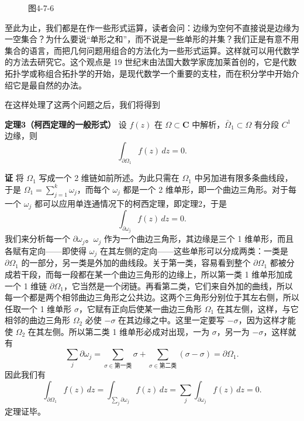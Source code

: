 \begin{figure}[htbp]
\centering
{}
\caption*{图4-7-6}
\end{figure}

至此为止，我们都是在作一些形式运算，读者会问：边缘为空何不直接说是边缘为一空集合？为什么要说“单形之和”，而不说是一些单形的并集？我们正是有意不用集合的语言，而把几何问题用组合的方法化为一些形式运算。这样就可以用代数学的方法去研究它。这个观点是 19 世纪末由法国大数学家庞加莱首创的，它是代数拓扑学或称组合拓扑学的开始，是现代数学一个重要的支柱，而在积分学中开始介绍它是最自然的办法。

在这样处理了这两个问题之后，我们将得到

\noindent\textbf{定理3（柯西定理的一般形式）}
设 $f(z)$ 在 $\Omega\subset\mathbf C$ 中解析，$\bar\Omega_1\subset\Omega$ 有分段 $C^1$ 边缘，则
\[
 \int_{\partial\Omega_1}f(z)\,dz=0.
\]

\noindent\textbf{证}
将 $\Omega_1$ 写成一个 2 维链如前所述。为此只需在 $\Omega_1$ 中另加进有限多条曲线段，于是 $\Omega_1=\sum_{j=1}^k\omega_j$，而每个 $\omega_j$ 都是一个 2 维单形，即一个曲边三角形。对于每一个 $\omega_j$ 都可以应用单连通情况下的柯西定理，即定理2，于是
\[
 \int_{\partial\omega_j}f(z)\,dz=0.
\]
我们来分析每一个 $\partial\omega_j$。$\omega_j$ 作为一个曲边三角形，其边缘是三个 1 维单形，而且各赋有定向——即使得 $\omega_j$ 在其左侧的定向——这些单形可以分成两类：一类是 $\partial\Omega_1$ 的一部分，另一类是外加的曲线段。关于第一类，容易看到整个 $\partial\Omega_1$ 都被分成若干段，而每一段都在某一个曲边三角形的边缘上，所以第一类 1 维单形加成一个 1 维链 $\partial\Omega_1$，它当然是一个闭链。再看第二类，它们来自外加的曲线，所以每一个都是两个相邻曲边三角形之公共边。这两个三角形分别位于其左右侧，所以任取一个 1 维单形 $\sigma$，它赋有正向后使某一曲边三角形 $\Omega_1$ 在其左侧，这样，与它相邻的曲边三角形 $\Omega_2$ 必使 $-\sigma$ 在其边缘之中。这里一定要写 $-\sigma$，因为这样才能使 $\Omega_2$ 在其左侧。所以第二类 1 维单形必成对出现，一为 $\sigma$，另一为 $-\sigma$，这样就有
\[
 \sum_j\partial\omega_j
 =\sum_{\sigma\in\text{第一类}}\sigma
 +\sum_{\sigma\in\text{第二类}}(\sigma-\sigma)
 =\partial\Omega_1.
\]
因此我们有
\[
 \int_{\partial\Omega_1}f(z)\,dz
 =\int_{\sum_j\partial\omega_j}f(z)\,dz
 =\sum_j\int_{\partial\omega_j}f(z)\,dz=0.
\]
定理证毕。

